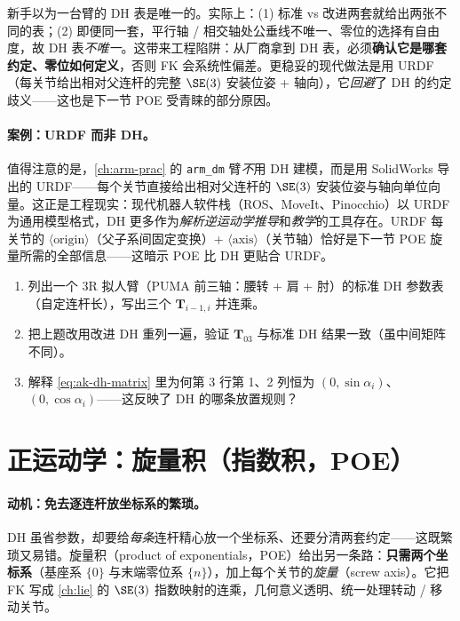\begin{pitfall}[概念误区：DH 参数“唯一”]
新手以为一台臂的 DH 表是唯一的。实际上：(1) 标准 vs 改进两套就给出两张不同的表；(2) 即便同一套，平行轴 / 相交轴处公垂线不唯一、零位的选择有自由度，故 DH 表\emph{不唯一}。这带来工程陷阱：从厂商拿到 DH 表，必须\textbf{确认它是哪套约定、零位如何定义}，否则 FK 会系统性偏差。更稳妥的现代做法是用 URDF（每关节给出相对父连杆的完整 $\SE(3)$ 安装位姿 + 轴向），它\emph{回避}了 DH 的约定歧义——这也是下一节 POE 受青睐的部分原因。
\end{pitfall}

\paragraph{案例：URDF 而非 DH。}
值得注意的是，\cref{ch:arm-prac} 的 \texttt{arm\_dm} 臂\emph{不}用 DH 建模，而是用 SolidWorks 导出的 URDF——每个关节直接给出相对父连杆的 $\SE(3)$ 安装位姿与轴向单位向量。这正是工程现实：现代机器人软件栈（ROS、MoveIt、Pinocchio）以 URDF 为通用模型格式，DH 更多作为\emph{解析逆运动学推导}和\emph{教学}的工具存在。URDF 每关节的 $\langle\text{origin}\rangle$（父子系间固定变换）+ $\langle\text{axis}\rangle$（关节轴）恰好是下一节 POE 旋量所需的全部信息——这暗示 POE 比 DH 更贴合 URDF。

\begin{practice}
\begin{enumerate}
  \item 列出一个 3R 拟人臂（PUMA 前三轴：腰转 + 肩 + 肘）的标准 DH 参数表（自定连杆长），写出三个 $\mathbf{T}_{i-1,i}$ 并连乘。
  \item 把上题改用改进 DH 重列一遍，验证 $\mathbf{T}_{03}$ 与标准 DH 结果一致（虽中间矩阵不同）。
  \item 解释 \cref{eq:ak-dh-matrix} 里为何第 3 行第 1、2 列恒为 $(0,\sin\alpha_i)$、$(0,\cos\alpha_i)$——这反映了 DH 的哪条放置规则？
\end{enumerate}
\end{practice}

\section{正运动学：旋量积（指数积，POE）}
\label{sec:ak-poe}

\paragraph{动机：免去逐连杆放坐标系的繁琐。}
DH 虽省参数，却要给\emph{每条}连杆精心放一个坐标系、还要分清两套约定——这既繁琐又易错。旋量积（product of exponentials，POE）给出另一条路\cite{lynch2017modern}：\textbf{只需两个坐标系}（基座系 $\{0\}$ 与末端零位系 $\{n\}$），加上每个关节的\emph{旋量}（screw axis）。它把 FK 写成 \cref{ch:lie} 的 $\SE(3)$ 指数映射的连乘，几何意义透明、统一处理转动 / 移动关节。

